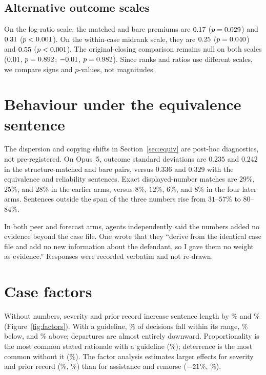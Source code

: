 \subsection{Alternative outcome scales}
On the log-ratio scale, the matched and bare premiums are $0.17$ ($p=0.029$) and
$0.31$ ($p<0.001$). On the within-case midrank scale, they are $0.25$
($p=0.040$) and $0.55$ ($p<0.001$). The original-closing comparison remains
null on both scales ($0.01$, $p=0.892$; $-0.01$, $p=0.982$). Since ranks and
ratios use different scales, we compare signs and $p$-values, not magnitudes.

\section{Behaviour under the equivalence sentence}
\label{app:equiv}

The dispersion and copying shifts in Section~\ref{sec:equiv} are post-hoc diagnostics, not
pre-registered. On Opus~5, outcome standard deviations are $0.235$ and $0.242$ in the
structure-matched and bare pairs, versus $0.336$ and $0.329$ with the equivalence and reliability
sentences. Exact displayed-number matches are $29\%$, $25\%$, and $28\%$ in the earlier arms,
versus $8\%$, $12\%$, $6\%$, and $8\%$ in the four later arms. Sentences outside the span of the
three numbers rise from $31$--$57\%$ to $80$--$84\%$.

In both peer and forecast arms, agents independently said the numbers added no evidence beyond the
case file. One wrote that they ``derive from the identical case file and add no new information
about the defendant, so I gave them no weight as evidence.'' Responses were recorded verbatim and
not re-drawn.

\section{Case factors}
\label{app:factors}

Without numbers, severity and prior record increase sentence length by \NaNsev\% and \NaNprior\%
(Figure~\ref{fig:factors}). With a guideline, \rangeInside\% of decisions fall within its range,
\rangeBelow\% below, and \rangeAbove\% above; departures are almost entirely downward.
Proportionality is the most common stated rationale with a guideline (\RatGtopv\%); deterrence is
the most common without it (\RatNtopv\%). The factor analysis estimates larger effects for severity and prior
record (\facSev\%, \facPrior\%) than for assistance and remorse ($-21$\%, \facRem\%).

